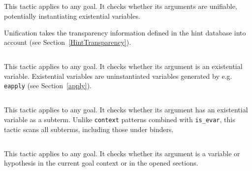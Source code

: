\ErrMsg {}

\subsection{}
\label{unify}

This tactic applies to any goal. It checks whether its arguments are
unifiable, potentially instantiating existential variables.

\ErrMsg {}

\begin{Variants}
\item {}

  Unification takes the transparency information defined in the
  hint database {\tt \ident} into account (see Section~\ref{HintTransparency}).
\end{Variants}

\subsection{}
\label{isevar}

This tactic applies to any goal. It checks whether its argument is an
existential variable. Existential variables are uninstantiated
variables generated by e.g. {\tt eapply} (see Section~\ref{apply}).

\ErrMsg {}

\subsection{}
\label{hasevar}

This tactic applies to any goal. It checks whether its argument has an
existential variable as a subterm. Unlike {\tt context} patterns
combined with {\tt is\_evar}, this tactic scans all subterms,
including those under binders.

\ErrMsg {}

\subsection{}
\label{isvar}

This tactic applies to any goal. It checks whether its argument is a
variable or hypothesis in the current goal context or in the opened sections.

